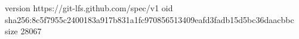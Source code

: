 version https://git-lfs.github.com/spec/v1
oid sha256:8c5f7955c2400183a917b831a1fc970856513409eafd3fadb15d5bc36daacbbc
size 28067

